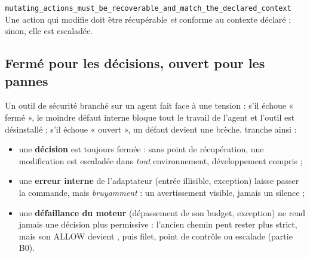 \begin{encadre}[Invariant]
\texttt{mutating\_actions\_must\_be\_recoverable\_and\_match\_the\_declared\_context}\\[2pt]
Une action qui modifie doit être récupérable \emph{et} conforme au contexte déclaré ;
sinon, elle est escaladée.
\end{encadre}

\subsection{Fermé pour les décisions, ouvert pour les pannes}
Un outil de sécurité branché sur un agent fait face à une tension : s'il échoue « fermé »,
le moindre défaut interne bloque tout le travail de l'agent et l'outil est désinstallé ;
s'il échoue « ouvert », un défaut devient une brèche. \demo{} tranche ainsi :
\begin{itemize}
  \item une \textbf{décision} est toujours fermée : sans point de récupération, une
    modification est escaladée dans \emph{tout} environnement, développement compris ;
  \item une \textbf{erreur interne} de l'adaptateur (entrée illisible, exception) laisse
    passer la commande, mais \emph{bruyamment} : un avertissement visible, jamais un
    silence ;
  \item une \textbf{défaillance du moteur} (dépassement de son budget, exception) ne rend
    jamais une décision plus permissive : l'ancien chemin peut rester plus strict, mais son
    ALLOW devient , puis filet, point de contrôle ou escalade
    (partie B0).
\end{itemize}
